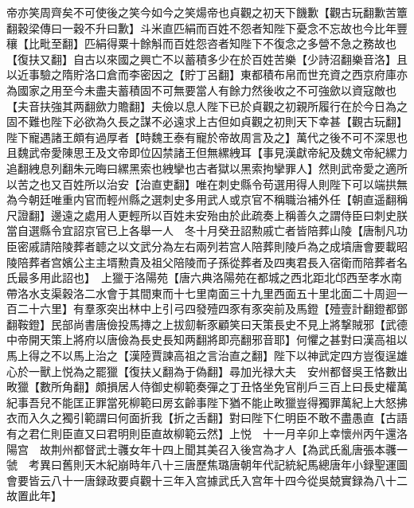 帝亦笑周齊矣不可使後之笑今如今之笑煬帝也貞觀之初天下饑歉【觀古玩翻歉苦簟翻穀梁傳曰一穀不升曰歉】斗米直匹絹而百姓不怨者知陛下憂念不忘故也今比年豐穰【比毗至翻】匹絹得粟十餘斛而百姓怨咨者知陛下不復念之多營不急之務故也【復扶又翻】自古以來國之興亡不以蓄積多少在於百姓苦樂【少詩沼翻樂音洛】且以近事驗之隋貯洛口倉而李密因之【貯丁呂翻】東都積布帛而世充資之西京府庫亦為國家之用至今未盡夫蓄積固不可無要當人有餘力然後收之不可強歛以資寇敵也【夫音扶強其两翻歛力贍翻】夫儉以息人陛下已於貞觀之初親所履行在於今日為之固不難也陛下必欲為久長之謀不必遠求上古但如貞觀之初則天下幸甚【觀古玩翻】陛下寵遇諸王頗有過厚者【時魏王泰有寵於帝故周言及之】萬代之後不可不深思也且魏武帝愛陳思王及文帝即位囚禁諸王但無縲絏耳【事見漢獻帝紀及魏文帝紀縲力追翻絏息列翻朱元晦曰縲黑索也絏攣也古者獄以黑索拘攣罪人】然則武帝愛之適所以苦之也又百姓所以治安【治直吏翻】唯在刺史縣令苟選用得人則陛下可以端拱無為今朝廷唯重内官而輕州縣之選刺史多用武人或京官不稱職治補外任【朝直遥翻稱尺證翻】邊遠之處用人更輕所以百姓未安殆由於此疏奏上稱善久之謂侍臣曰刺史朕當自選縣令宜詔京官已上各舉一人　冬十月癸丑詔勲戚亡者皆陪葬山陵【唐制凡功臣密戚請陪陵葬者聼之以文武分為左右兩列若宫人陪葬則陵戶為之成墳唐會要載昭陵陪葬者宫嬪公主主壻勲貴及祖父陪陵而子孫從葬者及四夷君長入宿衛而陪葬者名氏最多用此詔也】　上獵于洛陽苑【唐六典洛陽苑在都城之西北距北邙西至孝水南帶洛水支渠穀洛二水會于其間東而十七里南面三十九里西面五十里北面二十周迴一百二十六里】有羣豕突出林中上引弓四發殪四豕有豕突前及馬鐙【殪壹計翻鐙都鄧翻鞍鐙】民部尚書唐儉投馬摶之上拔劎斬豕顧笑曰天策長史不見上將撃賊邪【武德中帝開天策上將府以唐儉為長史長知两翻將即亮翻邪音耶】何懼之甚對曰漢高祖以馬上得之不以馬上治之【漢陸賈諫高祖之言治直之翻】陛下以神武定四方豈復逞雄心於一獸上悦為之罷獵【復扶乂翻為于偽翻】尋加光禄大夫　安州都督吳王恪數出畋獵【數所角翻】頗損居人侍御史柳範奏彈之丁丑恪坐免官削戶三百上曰長史權萬紀事吾兒不能匡正罪當死柳範曰房玄齡事陛下猶不能止畋獵豈得獨罪萬紀上大怒拂衣而入久之獨引範謂曰何面折我【折之舌翻】對曰陛下仁明臣不敢不盡愚直【古語有之君仁則臣直又曰君明則臣直故柳範云然】上悦　十一月辛卯上幸懷州丙午還洛陽宫　故荆州都督武士彠女年十四上聞其美召入後宫為才人【為武氏亂唐張本彠一虢　考異曰舊則天木紀崩時年八十三唐歷焦璐唐朝年代記統紀馬總唐年小録聖運圖會要皆云八十一唐録政要貞觀十三年入宫據武氏入宫年十四今從吳兢實録為八十二故置此年】

